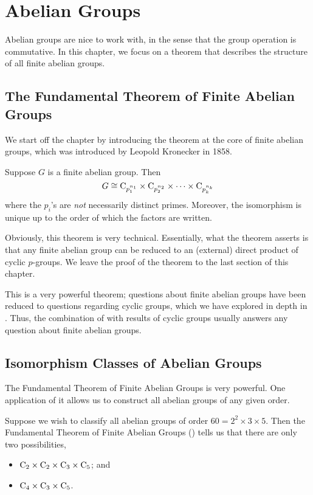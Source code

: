 \chapter{Abelian Groups}
Abelian groups are nice to work with, in the sense that the group operation is commutative. In this chapter, we focus on a theorem that describes the structure of all finite abelian groups.

\section{The Fundamental Theorem of Finite Abelian Groups}
We start off the chapter by introducing the theorem at the core of finite abelian groups, which was introduced by Leopold Kronecker in 1858.

\begin{theorem}\label{thrm-fundamental-theorem-of-finite-abelian-groups}
    Suppose $G$ is a finite abelian group. Then
    \[
        G \cong \mathrm{C}_{p_1^{n_1}} \times \mathrm{C}_{p_2^{n_2}} \times \cdots \times \mathrm{C}_{p_k^{n_k}}
    \]
    where the $p_i$'s are \textit{not} necessarily distinct primes. Moreover, the isomorphism is unique up to the order of which the factors are written.
\end{theorem}

Obviously, this theorem is very technical. Essentially, what the theorem asserts is that any finite abelian group can be reduced to an (external) direct product of cyclic $p$-groups. We leave the proof of the theorem to the last section of this chapter.

This is a very powerful theorem; questions about finite abelian groups have been reduced to questions regarding cyclic groups, which we have explored in depth in . Thus, the combination of  with results of cyclic groups usually answers any question about finite abelian groups.

\section{Isomorphism Classes of Abelian Groups}
The Fundamental Theorem of Finite Abelian Groups is very powerful. One application of it allows us to construct all abelian groups of any given order.

\begin{example}
    Suppose we wish to classify all abelian groups of order $60 = 2^2 \times 3 \times 5$. Then the Fundamental Theorem of Finite Abelian Groups () tells us that there are only two possibilities,
    \begin{itemize}
        \item $\mathrm{C}_{2} \times \mathrm{C}_{2} \times \mathrm{C}_{3} \times \mathrm{C}_{5}$; and
        \item $\mathrm{C}_{4} \times \mathrm{C}_{3} \times \mathrm{C}_{5}$.
    \end{itemize}
\end{example}

